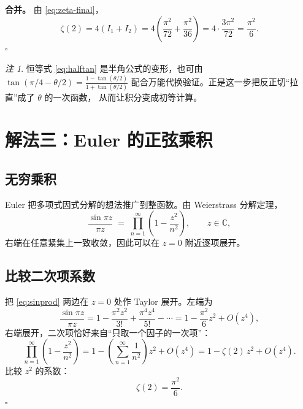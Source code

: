\documentclass[11pt,a4paper]{ctexart}
\theoremstyle{definition}
\theoremstyle{remark}
\newtheorem*{remark}{注}
\begin{document}
\noindent\textbf{合并。} 由 \eqref{eq:zeta-final}，
\begin{equation}
  \zeta(2)=4(I_{1}+I_{2})
  =4\left(\frac{\pi^{2}}{72}+\frac{\pi^{2}}{36}\right)
  =4\cdot\frac{3\pi^{2}}{72}
  =\frac{\pi^{2}}{6} .
\end{equation}
\hfill$\square$

\begin{remark}
恒等式 \eqref{eq:halftan} 是半角公式的变形，也可由
$\tan(\pi/4-\theta/2)=\frac{1-\tan(\theta/2)}{1+\tan(\theta/2)}$
配合万能代换验证。正是这一步把反正切``拉直''成了 $\theta$ 的一次函数，
从而让积分变成初等计算。
\end{remark}

\section{解法三：Euler 的正弦乘积}

\subsection{无穷乘积}

Euler 把多项式因式分解的想法推广到整函数。由 Weierstrass 分解定理，
\begin{equation}
  \frac{\sin \pi z}{\pi z}
  \;=\;\prod_{n=1}^{\infty}\left(1-\frac{z^{2}}{n^{2}}\right),
  \qquad z\in\mathbb{C},
  \label{eq:sinprod}
\end{equation}
右端在任意紧集上一致收敛，因此可以在 $z=0$ 附近逐项展开。

\subsection{比较二次项系数}

把 \eqref{eq:sinprod} 两边在 $z=0$ 处作 Taylor 展开。左端为
\begin{equation}
  \frac{\sin\pi z}{\pi z}
  =1-\frac{\pi^{2}z^{2}}{3!}+\frac{\pi^{4}z^{4}}{5!}-\cdots
  =1-\frac{\pi^{2}}{6}z^{2}+O(z^{4}),
\end{equation}
右端展开，二次项恰好来自``只取一个因子的一次项''：
\begin{equation}
  \prod_{n=1}^{\infty}\left(1-\frac{z^{2}}{n^{2}}\right)
  =1-\left(\sum_{n=1}^{\infty}\frac{1}{n^{2}}\right)z^{2}+O(z^{4})
  =1-\zeta(2)\,z^{2}+O(z^{4}).
\end{equation}
比较 $z^{2}$ 的系数：
\begin{equation}
  \zeta(2)=\frac{\pi^{2}}{6}.
\end{equation}
\hfill$\square$
\end{document}

